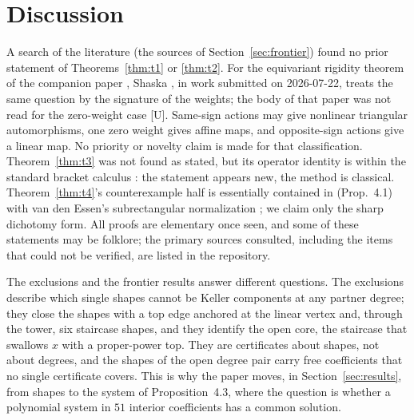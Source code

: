 \documentclass[11pt]{article}
\theoremstyle{remark}
\begin{document}
\section{Discussion}\label{sec:positioning}

A search of the literature (the sources of Section~\ref{sec:frontier}) found no prior
statement of Theorems~\ref{thm:t1} or \ref{thm:t2}. For the equivariant rigidity theorem of
the companion paper \cite{SLfoundational}, Shaska \cite{Shaska2026}, in work submitted on
2026-07-22, treats the same question by the signature of the weights; the body of that paper was not read for the zero-weight case [U].
Same-sign actions may give nonlinear triangular automorphisms, one zero weight gives affine
maps, and opposite-sign actions give a linear map. No priority or novelty claim is made for that classification.
Theorem~\ref{thm:t3} was not found as stated, but its
operator identity is within the standard bracket calculus \cite{Joseph1975, GGV2017}: the
statement appears new, the method is classical. Theorem~\ref{thm:t4}'s counterexample half
is essentially contained in \cite{GGV2017} (Prop.~4.1) with van den Essen's subrectangular
normalization \cite{vdEssen2000}; we claim only the sharp dichotomy form. All proofs are
elementary once seen, and some of these statements may be folklore; the primary sources
consulted, including the items that could not be verified, are listed in the repository.

The exclusions and the frontier results answer different questions. The exclusions describe which
single shapes cannot be Keller components at any partner degree; they close the shapes with a top edge anchored at the linear vertex and,
through the tower, six staircase shapes, and they identify the open core, the staircase that swallows $x$ with a proper-power top. They are certificates about
shapes, not about degrees, and the shapes of the open degree pair carry free coefficients that no single certificate covers. This is why the paper moves, in
Section~\ref{sec:results}, from shapes to the system of Proposition~4.3, where the question is whether a polynomial system in $51$ interior coefficients has a common solution.
\end{document}
